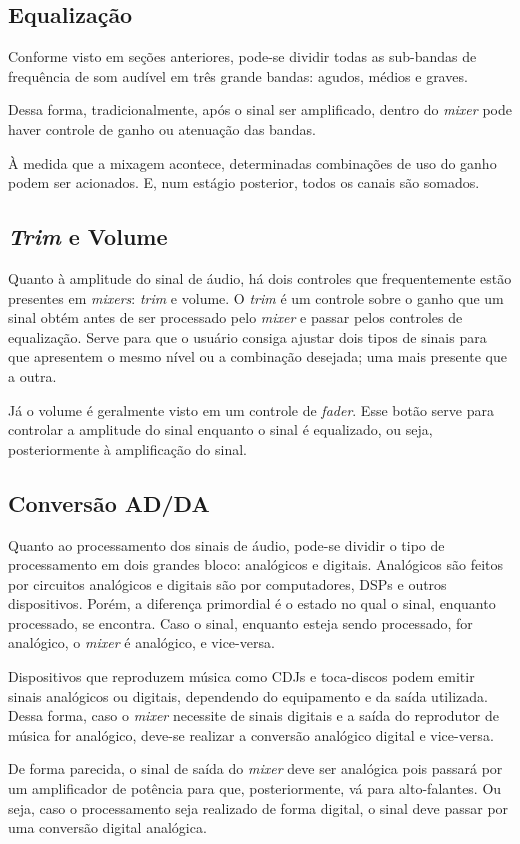 \subsection{Equalização}

Conforme visto em seções anteriores, pode-se dividir todas as sub-bandas de frequência de som audível em três grande bandas: agudos, médios e graves. 
\par
Dessa forma, tradicionalmente, após o sinal ser amplificado, dentro do \textit{mixer} pode haver controle de ganho ou atenuação das bandas.
\par
À medida que a mixagem acontece, determinadas combinações de uso do ganho podem ser acionados. E, num estágio posterior, todos os canais são somados.

\subsection{\textit{Trim} e Volume}
Quanto à amplitude do sinal de áudio, há dois controles que frequentemente estão presentes em \textit{mixers}: \textit{trim} e volume. O \textit{trim} é um controle sobre o ganho que um sinal obtém antes de ser processado pelo \textit{mixer} e passar pelos controles de equalização. Serve para que o usuário consiga ajustar dois tipos de sinais para que apresentem o mesmo nível ou a combinação desejada; uma mais presente que a outra.
\par
Já o volume é geralmente visto em um controle de \textit{fader}. Esse botão serve para controlar a amplitude do sinal enquanto o sinal é equalizado, ou seja, posteriormente à amplificação do sinal.

\subsection{Conversão AD/DA}
Quanto ao processamento dos sinais de áudio, pode-se dividir o tipo de processamento em dois grandes bloco: analógicos e digitais. Analógicos são feitos por circuitos analógicos e digitais são por computadores, DSPs e outros dispositivos. Porém, a diferença primordial é o estado no qual o sinal, enquanto processado, se encontra. Caso o sinal, enquanto esteja sendo processado, for analógico, o \textit{mixer} é analógico, e vice-versa.
\par
Dispositivos que reproduzem música como CDJs e toca-discos podem emitir sinais analógicos ou digitais, dependendo do equipamento e da saída utilizada. 
Dessa forma, caso o \textit{mixer} necessite de sinais digitais e a saída do reprodutor de música for analógico, deve-se realizar a conversão analógico digital e vice-versa.
\par
De forma parecida, o sinal de saída do \textit{mixer} deve ser analógica pois passará por um amplificador de potência para que, posteriormente, vá para alto-falantes. Ou seja, caso o processamento seja realizado de forma digital, o sinal deve passar por uma conversão digital analógica.
